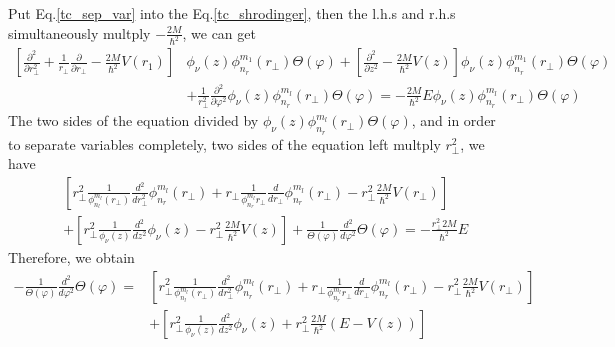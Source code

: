   Put Eq.\eqref{tc_sep_var} into the Eq.\eqref{tc_shrodinger}, then the l.h.s and r.h.s simultaneously multply $-\frac{2M}{\hbar^2}$, we can get
  \begin{equation}
    \begin{aligned}
        \left[ \frac{\partial^{2}}{\partial r_{\perp}^{2}}+\frac{1}{r_{\perp}} \frac{\partial}{\partial r_{\perp}}-\frac{2 M}{\hbar^{2}}  V(r_{1}) \right] &\phi_{\nu}(z) \phi_{n_{r}}^{m_{1}}(r_{\perp})\Theta(\varphi) +\left[\frac{\partial^{2}}{\partial z^{2}}-\frac{2 M}{\hbar^{2}} V(z)\right] \phi_{\nu}(z) \phi_{n_{r}}^{m_{1}}(r_{\perp})\Theta(\varphi)\\
        &+\frac{1}{r_{\perp}^{2}} \frac{\partial^{2}}{\partial \varphi^{2}} \phi_{\nu}(z) \phi_{n_{r}}^{m_{l}}\left(r_{\perp}\right)\Theta(\varphi)=-\frac{2 M}{\hbar^{2}} E \phi_{\nu}(z) \phi_{n_{r}}^{m_{l}}\left(r_{\perp}\right)\Theta(\varphi)
    \end{aligned}
  \end{equation}
  The two sides of the equation divided by $\phi_{\nu}(z) \phi_{n_{r}}^{m_{l}}\left(r_{\perp}\right)\Theta(\varphi)$, and in order to separate variables completely, two sides of the equation left multply $r_\perp^2$, we have
  \begin{equation}
    \begin{aligned}
      &\left[r_{\perp}^{2} \frac{1}{\phi_{n_{l}}^{m_l}\left(r_{\perp}\right)} \frac{d^{2}}{d r_{\perp}^{2}} \phi_{n_{r}}^{m_l}\left(r_{\perp}\right)+r_{\perp} \frac{1}{\phi_{n_{r}}^{m_{l}} r_{\perp}} \frac{d}{d r_{\perp}} \phi_{n_{r}}^{m_{l}}\left(r_{\perp}\right)-r_{\perp}^{2} \frac{2 M}{\hbar^{2}} V\left(r_{\perp}\right)\right]\\
      &+\left[r_{\perp}^{2} \frac{1}{\phi_{\nu}(z)} \frac{d^{2}}{d z^{2}} \phi_{\nu}(z)-r_{\perp}^{2} \frac{2 M}{\hbar^{2}} V(z)\right]+\frac{1}{\Theta(\varphi)} \frac{d^{2}}{d \varphi^{2}}\Theta(\varphi)=-\frac{r_{\perp}^{2} 2 M}{\hbar^{2}} E
    \end{aligned}
  \end{equation}
  Therefore, we obtain
  \begin{equation}
    \begin{aligned}
      -\frac{1}{\Theta(\varphi)} \frac{d^{2}}{d \varphi^{2}}\Theta(\varphi) = 
      &\left[r_{\perp}^{2} \frac{1}{\phi_{n_{l}}^{m_l}\left(r_{\perp}\right)} \frac{d^{2}}{d r_{\perp}^{2}} \phi_{n_{r}}^{m_l}\left(r_{\perp}\right)+r_{\perp} \frac{1}{\phi_{n_{r}}^{m_{l}} r_{\perp}} \frac{d}{d r_{\perp}} \phi_{n_{r}}^{m_{l}}\left(r_{\perp}\right)-r_{\perp}^{2} \frac{2 M}{\hbar^{2}} V\left(r_{\perp}\right)\right]\\
      &+\left[r_{\perp}^{2} \frac{1}{\phi_{\nu}(z)} \frac{d^{2}}{d z^{2}} \phi_{\nu}(z) + r_{\perp}^{2} \frac{2 M}{\hbar^{2}}\left( E - V(z)\right)\right]  \label{tc_sep_first}
    \end{aligned}
  \end{equation}
